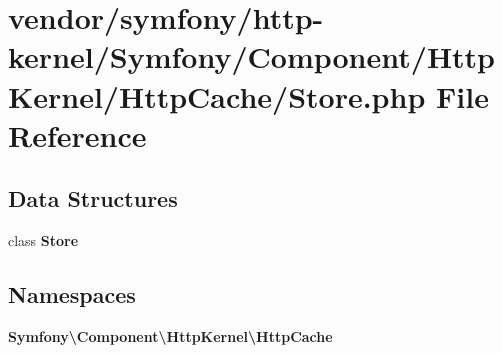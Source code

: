 \section{vendor/symfony/http-\/kernel/\+Symfony/\+Component/\+Http\+Kernel/\+Http\+Cache/\+Store.php File Reference}
\label{symfony_2http-kernel_2_symfony_2_component_2_http_kernel_2_http_cache_2_store_8php}
\subsection*{Data Structures}
\begin{DoxyCompactItemize}
\item 
class {\bf Store}
\end{DoxyCompactItemize}
\subsection*{Namespaces}
\begin{DoxyCompactItemize}
\item 
 {\bf Symfony\textbackslash{}\+Component\textbackslash{}\+Http\+Kernel\textbackslash{}\+Http\+Cache}
\end{DoxyCompactItemize}

